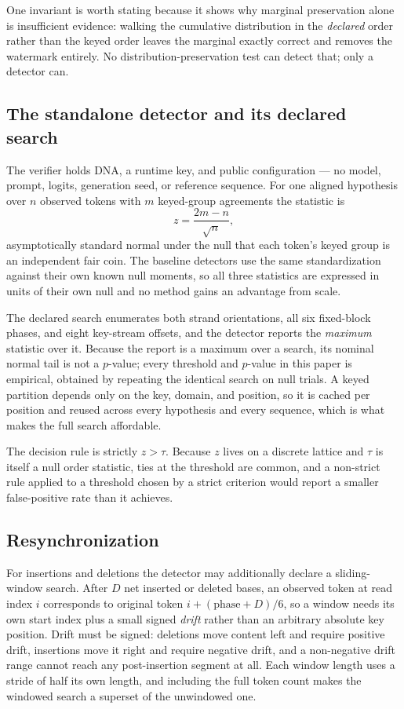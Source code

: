 One invariant is worth stating because it shows why marginal preservation alone is insufficient
evidence: walking the cumulative distribution in the \emph{declared} order rather than the keyed order
leaves the marginal exactly correct and removes the watermark entirely. No
distribution-preservation test can detect that; only a detector can.

\subsection{The standalone detector and its declared search}

The verifier holds DNA, a runtime key, and public configuration --- no model, prompt, logits,
generation seed, or reference sequence. For one aligned hypothesis over $n$ observed tokens with $m$
keyed-group agreements the statistic is
\[
z = \frac{2m-n}{\sqrt{n}},
\]
asymptotically standard normal under the null that each token's keyed group is an independent fair
coin. The baseline detectors use the same standardization against their own known null moments, so all
three statistics are expressed in units of their own null and no method gains an advantage from scale.

The declared search enumerates both strand orientations, all six fixed-block phases, and eight
key-stream offsets, and the detector reports the \emph{maximum} statistic over it. Because the report
is a maximum over a search, its nominal normal tail is not a $p$-value; every threshold and $p$-value
in this paper is empirical, obtained by repeating the identical search on null trials. A keyed
partition depends only on the key, domain, and position, so it is cached per position and reused across
every hypothesis and every sequence, which is what makes the full search affordable.

The decision rule is strictly $z > \tau$. Because $z$ lives on a discrete lattice and $\tau$ is itself a
null order statistic, ties at the threshold are common, and a non-strict rule applied to a threshold
chosen by a strict criterion would report a smaller false-positive rate than it achieves.

\subsection{Resynchronization}

For insertions and deletions the detector may additionally declare a sliding-window search. After $D$
net inserted or deleted bases, an observed token at read index $i$ corresponds to original token
$i + (\text{phase}+D)/6$, so a window needs its own start index plus a small signed \emph{drift} rather
than an arbitrary absolute key position. Drift must be signed: deletions move content left and require
positive drift, insertions move it right and require negative drift, and a non-negative drift range
cannot reach any post-insertion segment at all. Each window length uses a stride of half its own
length, and including the full token count makes the windowed search a superset of the unwindowed one.

